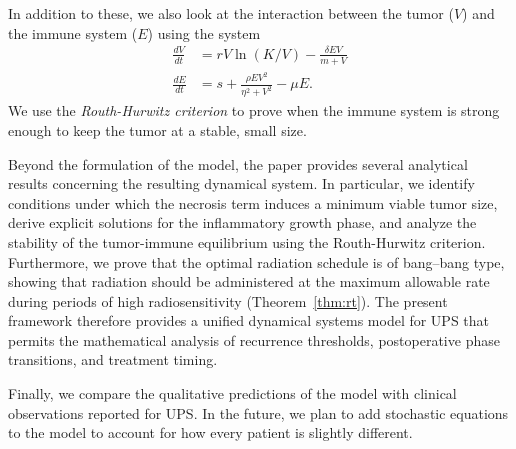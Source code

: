 \documentclass[11pt, reqno]{amsart}
\numberwithin{equation}{section}
\theoremstyle{definition}
\begin{document}
In addition to these, we also look at the interaction between the tumor ($V$) and the immune system ($E$) using the system
\begin{align*}
\frac{dV}{dt} &= rV \ln(K/V) - \frac{\delta E V}{m + V} \\
\frac{dE}{dt} &= s + \frac{\rho E V^2}{\eta^2 + V^2} - \mu E.
\end{align*}
We use the \textit{Routh-Hurwitz criterion} to prove when the immune system is strong enough to keep the tumor at a stable, small size.

Beyond the formulation of the model, the paper provides several analytical results concerning the resulting dynamical system. In particular, we identify conditions under which the necrosis term induces a minimum viable tumor size, derive explicit solutions for the inflammatory growth phase, and analyze the stability of the tumor-immune equilibrium using the Routh-Hurwitz criterion. Furthermore, we prove that the optimal radiation schedule is of
bang--bang type, showing that radiation should be administered at the maximum allowable rate during periods of high radiosensitivity (Theorem~\ref{thm:rt}). The present framework therefore provides a unified dynamical systems model for UPS that permits the mathematical analysis of recurrence thresholds, postoperative phase transitions, and treatment timing.

Finally, we compare the qualitative predictions of the model with clinical observations reported for UPS. In the future, we plan to add stochastic equations to the model to account for how every patient is slightly different.
\end{document}
